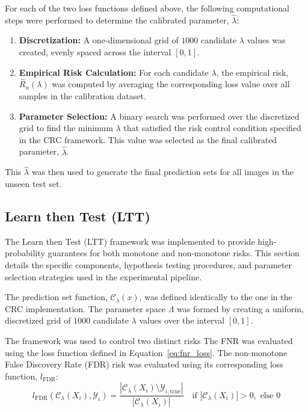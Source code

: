 For each of the two loss functions defined above,
the following computational steps were performed to determine the calibrated parameter,
\(\hat{\lambda}\):
\begin{enumerate}
    \item \textbf{Discretization:}
    A one-dimensional grid of \(1000\) candidate \(\lambda\) values was created,
    evenly spaced across the interval \([0, 1]\).

    \item \textbf{Empirical Risk Calculation:}
    For each candidate \(\lambda\), the empirical risk, \(\hat{R}_n(\lambda)\) was computed
    by averaging the corresponding loss value over all samples in the calibration dataset.

    \item \textbf{Parameter Selection:} A binary search was performed over the discretized grid
    to find the minimum \(\lambda\) that satisfied the risk control condition
    specified in the CRC framework.
    This value was selected as the final calibrated parameter, \(\hat{\lambda}\).
\end{enumerate}

This \(\hat{\lambda}\) was then used to generate the final prediction sets
for all images in the unseen test set.

\subsection{Learn then Test (LTT)}

The Learn then Test (LTT) framework was implemented to provide high-probability guarantees
for both monotone and non-monotone risks.
This section details the specific components, hypothesis testing procedures,
and parameter selection strategies used in the experimental pipeline.

The prediction set function, \(\mathcal{C}_\lambda(x)\),
was defined identically to the one in the CRC implementation.
The parameter space \(\Lambda\) was formed by creating a uniform,
discretized grid of \(1000\) candidate \(\lambda\) values over the interval \([0, 1]\).

The framework was used to control two distinct risks
The FNR was evaluated using the loss function defined in Equation~\ref{eq:fnr_loss}.
The non-monotone False Discovery Rate (FDR) risk was evaluated
using its corresponding loss function, \(l_{\text{FDR}}\):
\[
    l_{\text{FDR}}(\mathcal{C}_\lambda(X_i), \mathcal{Y}_i) = \frac{|\mathcal{C}_\lambda(X_i) \setminus \mathcal{Y}_{i, \text{true}}|}{|\mathcal{C}_\lambda(X_i)|} \quad \text{if } |\mathcal{C}_\lambda(X_i)| > 0, \text{ else } 0
\]

